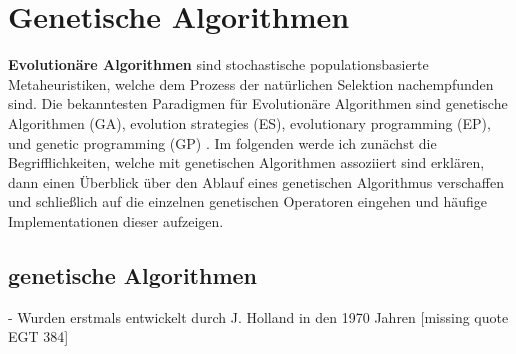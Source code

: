 \section{Genetische Algorithmen}
\textbf{Evolutionäre Algorithmen} sind stochastische populationsbasierte Metaheuristiken, welche dem Prozess der natürlichen Selektion nachempfunden sind. Die bekanntesten Paradigmen für Evolutionäre Algorithmen sind genetische Algorithmen (GA), evolution strategies (ES), evolutionary programming (EP), und genetic programming (GP) \cite*{MetaheuristicsEGT}. 
Im folgenden werde ich zunächst die Begrifflichkeiten, welche mit genetischen Algorithmen assoziiert sind erklären, dann einen Überblick über den Ablauf eines genetischen Algorithmus verschaffen und schließlich auf die einzelnen genetischen Operatoren eingehen und häufige Implementationen dieser aufzeigen.


\subsection*{genetische Algorithmen}
- Wurden erstmals entwickelt durch J. Holland in den 1970 Jahren [missing quote EGT 384]

